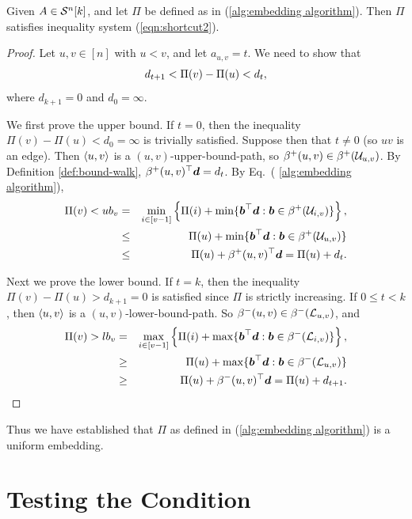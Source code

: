 \documentclass[runningheads]{llncs}
\begin{document}
\begin{lemma}\label{theorem:correctness of Pi}
Given \diagincmat{} $A\in\calS^n[k]$, and let $\Pi$ be defined as in (\ref{alg:embedding algorithm}). Then $\Pi$ satisfies inequality system (\ref{eqn:shortcut2}).
\end{lemma}

\begin{proof}
Let $u,v\in[n]$ with $u<v$, and let $a_{u,v}=t$.
We need to show that 
$$d_{t+1} < \dist uv < d_t,
$$
where $d_{k+1}=0$ and $d_0=\infty$.

We first prove the upper bound. If $t=0$, then the inequality $\Pi(v)-\Pi(u)<d_0=\infty$ is trivially satisfied.
Suppose then that $t\neq 0$ (so $uv$ is an edge).  Then $\path{u,v}$ is a $(u,v)$-upper-bound-path, so $\beta^+(u,v)\in \upperbd uv$. By Definition \ref{def:bound-walk}, $\beta^+(u,v)^\top \bmd = d_{t}$. 
By Eq.~( \ref{alg:embedding algorithm}), 
\begin{eqnarray*}
\Pi(v)< ub_v &= & \min_{i\in[v-1]}\left\{ \Pi(i)+ \min\{\bmb^\top\bmd: \bmb\in\upperbd iv\} \right\},\\ 
&\leq &  \Pi(u)+ \min\{\bmb^\top\bmd: \bmb\in\upperbd uv\} \\
&\leq &  \Pi (u) + \beta^+(u,v)^\top\bmd =\Pi(u)+d_t.
\end{eqnarray*}

Next we prove the lower bound.
If $t=k$, then the inequality $\Pi(v)-\Pi(u)>d_{k+1}=0$ is satisfied since $\Pi$ is strictly increasing. 
If $0\leq t<k$, then $\path{u,v}$ is a $(u,v)$-lower-bound-path. So  $\beta^-(u,v)\in \lowerbd uv$, and 
\begin{eqnarray*}
\Pi(v)> lb_v &= & \max_{i\in[v-1]}\left\{ \Pi(i)+ \max\{\bmb^\top\bmd: \bmb\in\lowerbd iv\} \right\},\\ 
&\geq &  \Pi(u)+ \max\{\bmb^\top\bmd: \bmb\in\lowerbd uv\} \\
&\geq &  \Pi (u) + \beta^-(u,v)^\top\bmd =\Pi(u)+d_{t+1}.
\end{eqnarray*}

\end{proof}

Thus we have established that $\Pi$ as defined in (\ref{alg:embedding algorithm}) is a uniform embedding.


%

\section{Testing the Condition}
\end{document}

